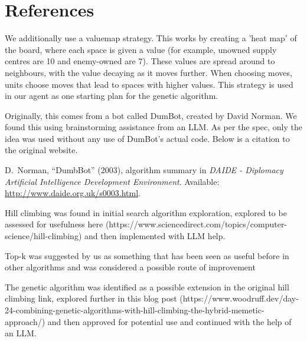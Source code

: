 \documentclass[12pt,a4paper]{article}
\begin{document}
\section{References}
We additionally use a valuemap strategy. This works by creating a 'heat map' of the board, where each space is given a value (for example, unowned supply centres are 10 and enemy-owned are 7).
These values are spread around to neighbours, with the value decaying as it moves further. When choosing moves, units choose moves that lead to spaces with higher values.
This strategy is used in our agent as one starting plan for the genetic algorithm.

Originally, this comes from a bot called DumBot, created by David Norman. We found this using brainstorming assistance from an LLM.
As per the spec, only the idea was used without any use of DumBot's actual code. Below is a citation to the original website.

D.~Norman, ``DumbBot'' (2003), algorithm summary in \emph{DAIDE - Diplomacy Artificial Intelligence Development
Environment}. Available: \url{http://www.daide.org.uk/s0003.html}.

Hill climbing was found in initial search algorithm exploration, explored to be assessed for usefulness here (https://www.sciencedirect.com/topics/computer-science/hill-climbing) 
and then implemented with LLM help. 

Top-k was suggested by us as something that has been seen as useful before in other algorithms and was considered a possible route of 
improvement

The genetic algorithm was identified as a possible extension in the original hill climbing link, explored further in this blog post (https://www.woodruff.dev/day-24-combining-genetic-algorithms-with-hill-climbing-the-hybrid-memetic-approach/)
and then approved for potential use and continued with the help of an LLM.
\end{document}
